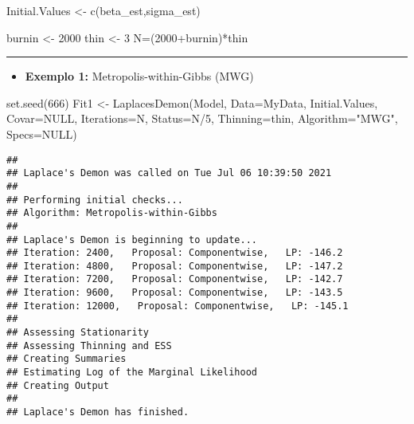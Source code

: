 \documentclass[
]{book}
\newenvironment{Shaded}{\begin{snugshade}}{\end{snugshade}}
\newcommand{\AttributeTok}[1]{\textcolor[rgb]{0.77,0.63,0.00}{#1}}
\newcommand{\ConstantTok}[1]{\textcolor[rgb]{0.00,0.00,0.00}{#1}}
\newcommand{\DecValTok}[1]{\textcolor[rgb]{0.00,0.00,0.81}{#1}}
\newcommand{\FunctionTok}[1]{\textcolor[rgb]{0.00,0.00,0.00}{#1}}
\newcommand{\NormalTok}[1]{#1}
\newcommand{\OtherTok}[1]{\textcolor[rgb]{0.56,0.35,0.01}{#1}}
\newcommand{\SpecialCharTok}[1]{\textcolor[rgb]{0.00,0.00,0.00}{#1}}
\newcommand{\StringTok}[1]{\textcolor[rgb]{0.31,0.60,0.02}{#1}}
\providecommand{\tightlist}{%
  \setlength{\itemsep}{0pt}\setlength{\parskip}{0pt}}
\begin{document}
\begin{Shaded}
\begin{Highlighting}[]
\NormalTok{Initial.Values }\OtherTok{\textless{}{-}} \FunctionTok{c}\NormalTok{(beta\_est,sigma\_est)}

\NormalTok{burnin }\OtherTok{\textless{}{-}} \DecValTok{2000}
\NormalTok{thin }\OtherTok{\textless{}{-}} \DecValTok{3}
\NormalTok{N}\OtherTok{=}\NormalTok{(}\DecValTok{2000}\SpecialCharTok{+}\NormalTok{burnin)}\SpecialCharTok{*}\NormalTok{thin}
\end{Highlighting}
\end{Shaded}

\begin{center}\rule{0.5\linewidth}{0.5pt}\end{center}

\begin{itemize}
\tightlist
\item
  \textbf{Exemplo 1:} Metropolis-within-Gibbs (MWG)
\end{itemize}

\begin{Shaded}
\begin{Highlighting}[]
\FunctionTok{set.seed}\NormalTok{(}\DecValTok{666}\NormalTok{)}
\NormalTok{Fit1 }\OtherTok{\textless{}{-}} \FunctionTok{LaplacesDemon}\NormalTok{(Model, }\AttributeTok{Data=}\NormalTok{MyData, Initial.Values,}
  \AttributeTok{Covar=}\ConstantTok{NULL}\NormalTok{, }\AttributeTok{Iterations=}\NormalTok{N, }\AttributeTok{Status=}\NormalTok{N}\SpecialCharTok{/}\DecValTok{5}\NormalTok{, }\AttributeTok{Thinning=}\NormalTok{thin,}
  \AttributeTok{Algorithm=}\StringTok{"MWG"}\NormalTok{, }\AttributeTok{Specs=}\ConstantTok{NULL}\NormalTok{)}
\end{Highlighting}
\end{Shaded}

\begin{verbatim}
## 
## Laplace's Demon was called on Tue Jul 06 10:39:50 2021
## 
## Performing initial checks...
## Algorithm: Metropolis-within-Gibbs 
## 
## Laplace's Demon is beginning to update...
## Iteration: 2400,   Proposal: Componentwise,   LP: -146.2
## Iteration: 4800,   Proposal: Componentwise,   LP: -147.2
## Iteration: 7200,   Proposal: Componentwise,   LP: -142.7
## Iteration: 9600,   Proposal: Componentwise,   LP: -143.5
## Iteration: 12000,   Proposal: Componentwise,   LP: -145.1
## 
## Assessing Stationarity
## Assessing Thinning and ESS
## Creating Summaries
## Estimating Log of the Marginal Likelihood
## Creating Output
## 
## Laplace's Demon has finished.
\end{verbatim}
\end{document}
